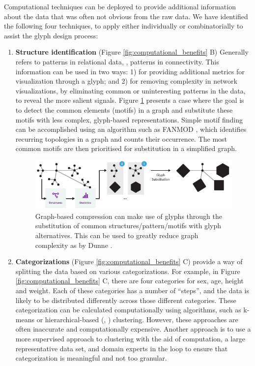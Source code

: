 Computational techniques can be deployed to provide additional information about the data that was often not obvious from the raw data.
We have identified the following four techniques, to apply either individually or combinatorially to assist the glyph design process:
\begin{enumerate}

\item \textbf{Structure identification} (Figure \ref{fig:computational_benefits} B) Generally refers to patterns in relational data, \eg, patterns in connectivity.
This information can be used in two ways: 1) for providing additional metrics for visualization through a glyph; and 2) for removing complexity in network visualizations, by eliminating common or uninteresting patterns in the data, to reveal the more salient signals.
Figure \ref{fig:structure_compress_glyph} presents a case where the goal is to detect the common elements (motifs) in a graph and substitute these motifs with less complex, glyph-based representations. 
Simple motif finding can be accomplished using an algorithm such as FANMOD \cite{wernicke06}, which identifies recurring topologies in a graph and counts their occurrence.
The most common motifs are then prioritised for substitution in a simplified graph.

\begin{figure}[h!]
\centering
\includegraphics[width=\textwidth]{images/ch3/structure_compress_glyph}
\caption{Graph-based compression can make use of glyphs through the substitution of common structures/pattern/motifs with glyph alternatives.
This can be used to greatly reduce graph complexity as by Dunne \etal \cite{dunnemotif2012}.}
\label{fig:structure_compress_glyph}
\end{figure}

\item \textbf{Categorizations} (Figure \ref{fig:computational_benefits} C) provide a way of splitting the data based on various categorizations.
For example, in Figure \ref{fig:computational_benefits} C, there are four categories for sex, age, height and weight.
Each of these categories has a number of ``steps'', and the data is likely to be distributed differently across those different categories.
These categorization can be calculated computationally using algorithms, such as k-means \cite{macqueen1967} or hierarchical-based (\eg, \cite{Sibson01011973}) clustering.
However, these approaches are often inaccurate and computationally expensive.
Another approach is to use a more supervised approach to clustering with the aid of computation, a large representative data set, and domain experts in the loop to ensure that categorization is meaningful and not too granular.


\end{enumerate}
